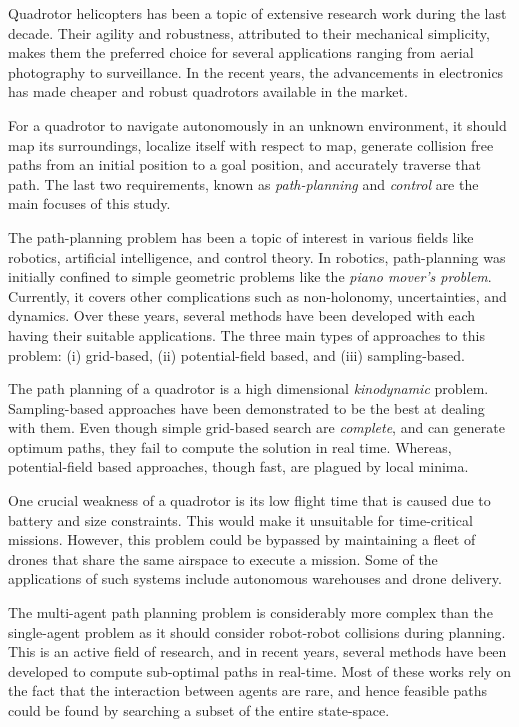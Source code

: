 Quadrotor helicopters has been a topic of extensive research work during the last decade. Their agility and robustness, attributed to their mechanical simplicity, makes them the preferred choice for several applications ranging from aerial photography to surveillance. In the recent years, the advancements in electronics has made cheaper and robust quadrotors available in the market. 

For a quadrotor to navigate autonomously in an unknown environment, it should map its surroundings, localize itself with respect to map, generate collision free paths from an initial position to a goal position, and accurately traverse that path. The last two requirements, known as \textit{path-planning} and \textit{control} are the main focuses of this study. 

The path-planning problem has been a topic of interest in various fields like robotics, artificial intelligence, and control theory. In robotics, path-planning was initially confined to simple geometric problems like the \textit{piano mover's problem}. Currently, it covers other complications such as non-holonomy, uncertainties, and dynamics. Over these years, several methods have been developed with each having their suitable applications. The three main types of approaches to this problem: (i) grid-based, (ii) potential-field based, and (iii) sampling-based. 

The path planning of a quadrotor is a high dimensional \textit{kinodynamic} problem. Sampling-based approaches have been demonstrated to be the best at dealing with them. Even though simple grid-based search are \textit{complete}, and can generate optimum paths, they fail to compute the solution in real time. Whereas, potential-field based approaches, though fast, are plagued by local minima. 

One crucial weakness of a quadrotor is its low flight time that is caused due to battery and size constraints. This would make it unsuitable for time-critical missions. However, this problem could be bypassed by maintaining a fleet of drones that share the same airspace to execute a mission. Some of the applications of such systems include autonomous warehouses and drone delivery. 

The multi-agent path planning problem is considerably more complex than the single-agent problem as it should consider robot-robot collisions during planning. This is an active field of research, and in recent years, several methods have been developed to compute sub-optimal paths in real-time. Most of these works rely on the fact that the interaction between agents are rare, and hence feasible paths could be found by searching a subset of the entire state-space. 

